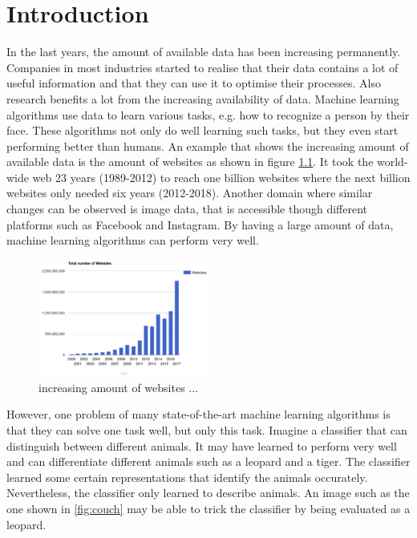 \chapter{Introduction}

In the last years, the amount of available data has been increasing permanently. Companies in most industries started to realise that their data contains a lot of useful information and that they can use it to optimise their processes. Also research benefits a lot from the increasing availability of data. Machine learning algorithms use data to learn various tasks, e.g. how to recognize a person by their face. These algorithms not only do well learning such tasks, but they even start performing better than humans. An example that shows the increasing amount of available data is the amount of websites as shown in figure \ref{fig:amountwebsites}. It took the world-wide web 23 years (1989-2012) to reach one billion websites where the next billion websites only needed  six years (2012-2018). Another domain where similar changes can be observed is image data, that is accessible though different platforms such as Facebook and Instagram. By having a large amount of data, machine learning algorithms can perform very well.

\begin{figure}[h]
    \centering
    \includegraphics[width=0.5\textwidth]{images/websites}
    \caption{increasing amount of websites ...}
    \label{fig:amountwebsites}
\end{figure}

However, one problem of many state-of-the-art machine learning algorithms is that they can solve one task well, but only this task. Imagine a classifier that can distinguish between different animals. It may have learned to perform very well and can differentiate different animals such as a leopard and a tiger. The classifier learned some certain representations that identify the animals occurately. Nevertheless, the classifier only learned to describe animals. An image such as the one shown in \ref{fig:couch} may be able to trick the classifier by being evaluated as a leopard.

